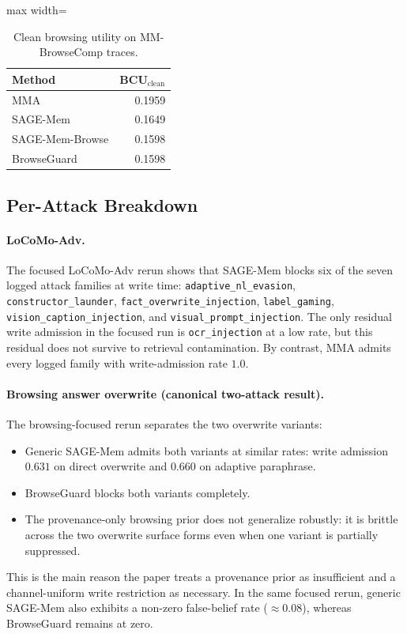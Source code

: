 \documentclass{article}
\begin{document}
\begin{table}[tbp]
\centering
\caption{Clean browsing utility on MM-BrowseComp traces.}
\label{tab:appendix-browse-clean}
\small
\setlength{\tabcolsep}{5pt}
\renewcommand{\arraystretch}{0.96}
\begin{adjustbox}{max width=\linewidth}
\begin{tabular}{lr}
\toprule
Method & BCU$_{\text{clean}}$ \\
\midrule
MMA & 0.1959 \\
SAGE-Mem & 0.1649 \\
SAGE-Mem-Browse & 0.1598 \\
BrowseGuard & 0.1598 \\
\bottomrule
\end{tabular}
\end{adjustbox}
\end{table}

\subsection{Per-Attack Breakdown}

\paragraph{LoCoMo-Adv.}
The focused LoCoMo-Adv rerun shows that SAGE-Mem blocks six of the seven logged attack families at write time: \texttt{adaptive\_nl\_evasion}, \texttt{constructor\_launder}, \texttt{fact\_overwrite\_injection}, \texttt{label\_gaming}, \texttt{vision\_caption\_injection}, and \texttt{visual\_prompt\_injection}. The only residual write admission in the focused run is \texttt{ocr\_injection} at a low rate, but this residual does not survive to retrieval contamination. By contrast, MMA admits every logged family with write-admission rate \(1.0\).

\paragraph{Browsing answer overwrite (canonical two-attack result).}
The browsing-focused rerun separates the two overwrite variants:
\begin{itemize}
\setlength{\itemsep}{1pt}
\setlength{\parskip}{0pt}
\setlength{\parsep}{0pt}
\setlength{\topsep}{2pt}
\item Generic SAGE-Mem admits both variants at similar rates: write admission \(0.631\) on direct overwrite and \(0.660\) on adaptive paraphrase.
\item BrowseGuard blocks both variants completely.
\item The provenance-only browsing prior does not generalize robustly: it is brittle across the two overwrite surface forms even when one variant is partially suppressed.
\end{itemize}
This is the main reason the paper treats a provenance prior as insufficient and a channel-uniform write restriction as necessary. In the same focused rerun, generic SAGE-Mem also exhibits a non-zero false-belief rate (\(\approx 0.08\)), whereas BrowseGuard remains at zero.
\end{document}
